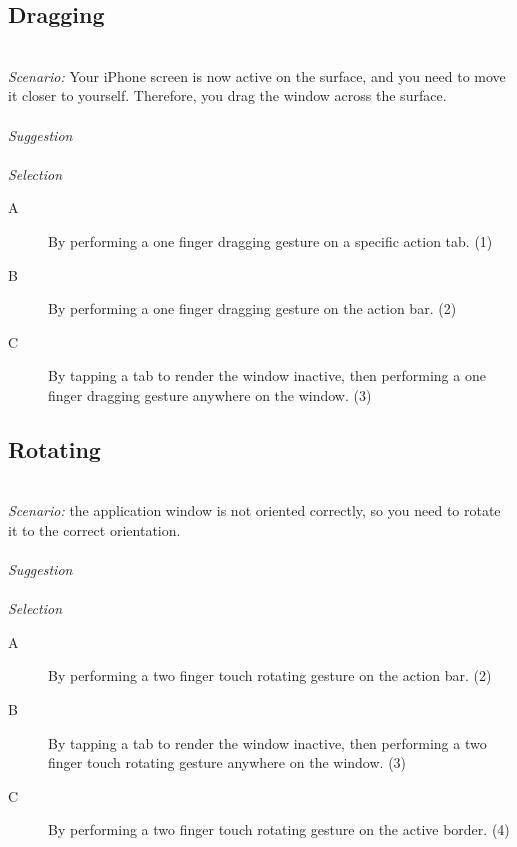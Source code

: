 


\subsection{Dragging}
\hfill\\
\emph{Scenario:}
Your iPhone screen is now active on the surface, and you need to move it closer to yourself. Therefore, you drag the window across the surface.
\\\\
\emph{Suggestion}
\\\\
\emph{Selection}
\begin{description}
\item[A]{By performing a one finger dragging gesture on a specific action tab. (1)}
\item[B]{By performing a one finger dragging gesture on the action bar. (2)}
\item[C]{By tapping a tab to render the window inactive, then performing a one finger dragging gesture anywhere on the window. (3)}
\end{description}


\subsection{Rotating}
\hfill\\
\emph{Scenario:}
the application window is not oriented correctly, so you need to rotate it to the correct orientation. 
\\\\
\emph{Suggestion}
\\\\
\emph{Selection}
\begin{description}
\item[A]{By performing a two finger touch rotating gesture on the action bar. (2)}
\item[B]{By tapping a tab to render the window inactive, then performing a two finger touch rotating gesture anywhere on the window. (3)}
\item[C]{By performing a two finger touch rotating gesture on the active border. (4)}
\end{description}


